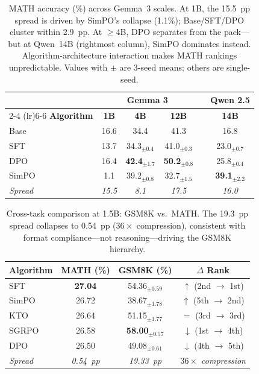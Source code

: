 \documentclass{article}
\begin{document}
\begin{table}[t]
\centering
\caption{MATH accuracy (\%) across Gemma~3 scales. At 1B, the 15.5~pp spread is driven by SimPO's collapse (1.1\%); Base/SFT/DPO cluster within 2.9~pp. At $\geq$4B, DPO separates from the pack---but at Qwen~14B (rightmost column), SimPO dominates instead. Algorithm-architecture interaction makes MATH rankings unpredictable. Values with $\pm$ are 3-seed means; others are single-seed.}
\label{tab:math_scaling}
\small
\begin{tabular}{@{}lccccc@{}}
\toprule
& \multicolumn{3}{c}{\textbf{Gemma 3}} & & \textbf{Qwen 2.5} \\
\cmidrule(lr){2-4} \cmidrule(lr){6-6}
\textbf{Algorithm} & \textbf{1B} & \textbf{4B} & \textbf{12B} & & \textbf{14B} \\
\midrule
Base & 16.6 & 34.4 & 41.3 & & 16.8 \\
SFT & 13.7 & 34.3$_{\pm 0.4}$ & 41.0$_{\pm 0.3}$ & & 23.0$_{\pm 0.7}$ \\
DPO & 16.4 & \textbf{42.4}$_{\pm 1.7}$ & \textbf{50.2}$_{\pm 0.8}$ & & 25.8$_{\pm 0.4}$ \\
SimPO & 1.1 & 39.2$_{\pm 0.8}$ & 32.7$_{\pm 1.5}$ & & \textbf{39.1}$_{\pm 2.2}$ \\
\midrule
\textit{Spread} & \textit{15.5} & \textit{8.1} & \textit{17.5} & & \textit{16.0} \\
\bottomrule
\end{tabular}
\end{table}

\begin{table}[t]
\centering
\caption{Cross-task comparison at 1.5B: GSM8K vs.\ MATH. The 19.3~pp spread collapses to 0.54~pp ($36\times$ compression), consistent with format compliance---not reasoning---driving the GSM8K hierarchy.}
\label{tab:math_results}
\small
\begin{tabular}{@{}lccc@{}}
\toprule
\textbf{Algorithm} & \textbf{MATH (\%)} & \textbf{GSM8K (\%)} & \textbf{$\Delta$ Rank} \\
\midrule
SFT & \textbf{27.04} & 54.36$_{\pm 0.59}$ & $\uparrow$ (2nd $\to$ 1st) \\
SimPO & 26.72 & 38.67$_{\pm 1.78}$ & $\uparrow$ (5th $\to$ 2nd) \\
KTO & 26.64 & 51.15$_{\pm 1.77}$ & $=$ (3rd $\to$ 3rd) \\
SGRPO & 26.58 & \textbf{58.00}$_{\pm 0.57}$ & $\downarrow$ (1st $\to$ 4th) \\
DPO & 26.50 & 49.08$_{\pm 0.61}$ & $\downarrow$ (4th $\to$ 5th) \\
\midrule
\textit{Spread} & \textit{0.54~pp} & \textit{19.33~pp} & \textit{$36\times$ compression} \\
\bottomrule
\end{tabular}
\end{table}
\end{document}
